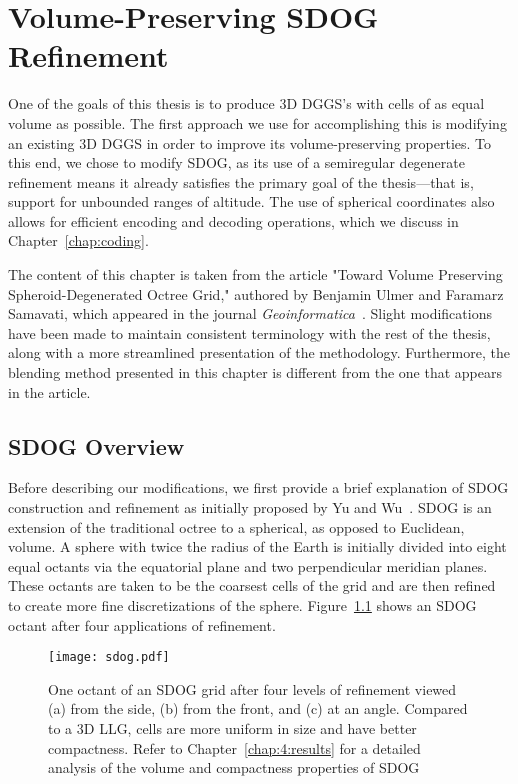 \chapter{Volume-Preserving SDOG Refinement} \label{chap:sdog}
One of the goals of this thesis is to produce 3D DGGS's with cells of as equal volume as possible.
The first approach we use for accomplishing this is modifying an existing 3D DGGS in order to improve its volume-preserving properties.
To this end, we chose to modify SDOG, as its use of a semiregular degenerate refinement means it already satisfies the primary goal of the thesis---that is, support for unbounded ranges of altitude.
The use of spherical coordinates also allows for efficient encoding and decoding operations, which we discuss in Chapter~\ref{chap:coding}.

The content of this chapter is taken from the article "Toward Volume Preserving Spheroid-Degenerated Octree Grid," authored by Benjamin Ulmer and Faramarz Samavati, which appeared in the journal \textit{Geoinformatica}~\cite{ulmer2020toward}.
Slight modifications have been made to maintain consistent terminology with the rest of the thesis, along with a more streamlined presentation of the methodology. Furthermore, the blending method presented in this chapter is different from the one that appears in the article.


\section{SDOG Overview} \label{chap:4:sdog}
Before describing our modifications, we first provide a brief explanation of SDOG construction and refinement as initially proposed by Yu and Wu~\cite{yu2009sdog}.
SDOG is an extension of the traditional octree to a spherical, as opposed to Euclidean, volume.
A sphere with twice the radius of the Earth is initially divided into eight equal octants via the equatorial plane and two perpendicular meridian planes.
These octants are taken to be the coarsest cells of the grid and are then refined to create more fine discretizations of the sphere.
Figure~\ref{fig:sdog} shows an SDOG octant after four applications of refinement.


\begin{figure}[ht!]
	\centering
	\texttt{[image: sdog.pdf]}
	\caption[Different views of an SDOG octant]{
		One octant of an SDOG grid after four levels of refinement viewed (a) from the side, (b) from the front, and (c) at an angle.
		Compared to a 3D LLG, cells are more uniform in size and have better compactness.
		Refer to Chapter~\ref{chap:4:results} for a detailed analysis of the volume and compactness properties of SDOG
	}
	\label{fig:sdog}
\end{figure}


